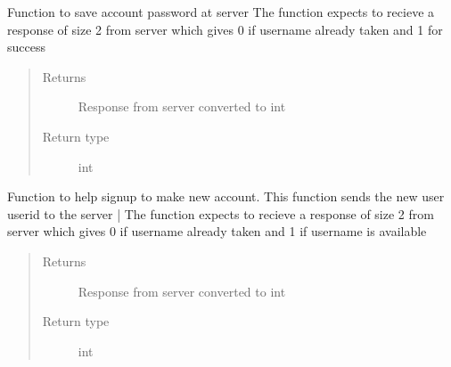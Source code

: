 \documentclass[letterpaper,10pt,english]{sphinxmanual}
\begin{document}
\begin{fulllineitems}

\begin{fulllineitems}
\label{\detokenize{Message:Message.Message._signuppass}}
Function to save account password at server
The function expects to recieve a response of size 2 from server which gives 0 if username already taken and 1 for success
\begin{quote}\begin{description}
\item[{Returns}] \leavevmode
Response from server converted to int

\item[{Return type}] \leavevmode
int

\end{description}\end{quote}

\end{fulllineitems}


\begin{fulllineitems}
\label{\detokenize{Message:Message.Message._signupuid}}
Function to help signup to make new account. This function sends the new user userid to the server |
The function expects to recieve a response of size 2 from server which gives 0 if username already taken and 1 if username is available
\begin{quote}\begin{description}
\item[{Returns}] \leavevmode
Response from server converted to int

\item[{Return type}] \leavevmode
int

\end{description}\end{quote}

\end{fulllineitems}


\begin{fulllineitems}
\label{\detokenize{Message:Message.Message._keyex}}
\end{fulllineitems}


\end{fulllineitems}
\end{document}
